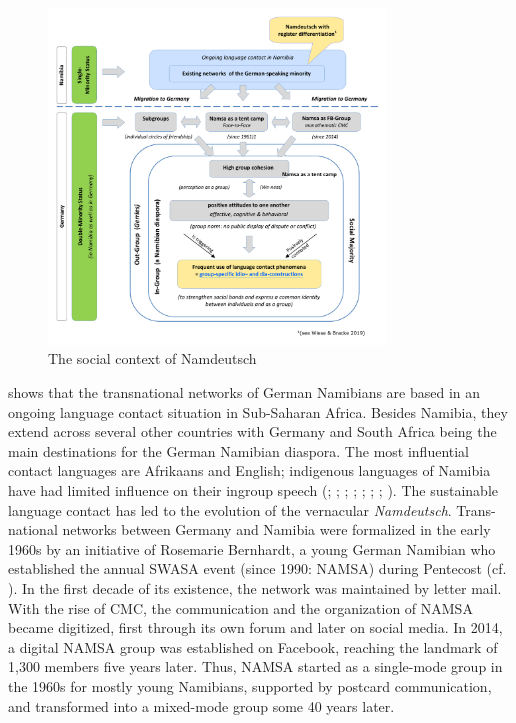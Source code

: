 \documentclass[output=paper]{langsci/langscibook}
\begin{document}
  
 

\begin{figure}
\includegraphics[width=0.8\textwidth]{figures/radkefig1-carla.pdf}
\caption{The social context of Namdeutsch}
\label{fig:radke:1}
\end{figure}  

\figref{
} shows that the transnational networks of German Namibians are based in an ongoing language contact situation in Sub-Saharan Africa. Besides Namibia, they extend across several other countries with Germany and South Africa being the main destinations for the German Namibian diaspora. The most influential contact languages are Afrikaans and English; indigenous languages of Namibia have had limited influence on their ingroup speech (\citealt{bohm_deutsch_2003}; \citealt{duck_namibia_2018}; \citealt{kellermeier-rehbein_namslang_2015, kellermeier-rehbein_sprache_2016}; \citealt{nockler_sprachmischung_1963}; \citealt{putz_sudwesterdeutsch_1991}; \citealt{wiese_deutsch_2014, wiese_german_2017, wiese_registerdifferenzierung_2021}; \citealt{zimmer_linguisticvar_toappear}; \citealt{zimmer_korpus_2020}). The sustainable language contact has led to the evolution of the vernacular \textit{Namdeutsch}. Trans-national networks between Germany and Namibia were formalized in the early 1960s by an initiative of Rosemarie Bernhardt, a young German Namibian who established the annual SWASA event (since 1990: NAMSA) during Pentecost (cf. \citealt{radke_afrikaans_2019a}). In the first decade of its existence, the network was maintained by letter mail. With the rise of CMC, the communication and the organization of NAMSA became digitized, first through its own forum and later on social media. In 2014, a digital NAMSA group was established on Facebook, reaching the landmark of 1,300 members five years later. Thus, NAMSA started as a single-mode group in the 1960s for mostly young Namibians, supported by postcard communication, and transformed into a mixed-mode group some 40 years later. 
\end{document}
